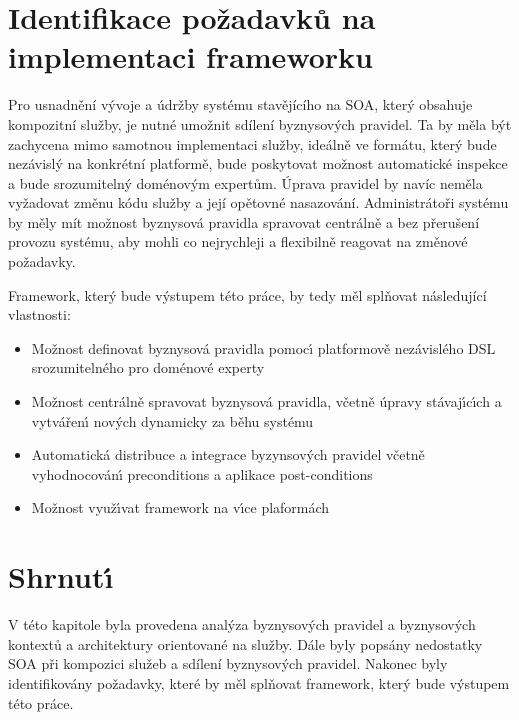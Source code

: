 \section{Identifikace požadavků na implementaci frameworku}\label{sec:implementation-requirements}

Pro usnadnění vývoje a údržby systému stavějícího na \gls{SOA}, který
obsahuje kompozitní služby, je nutné umožnit sdílení byznysových pravidel.
Ta by měla být zachycena mimo samotnou implementaci služby, ideálně ve formátu, který bude nezávislý na
konkrétní platformě, bude poskytovat možnost automatické inspekce a bude srozumitelný doménovým expertům.
Úprava pravidel by navíc neměla vyžadovat změnu kódu služby a její opětovné nasazování.
Administrátoři systému by měly mít možnost byznysová pravidla spravovat centrálně a bez
přerušení provozu systému, aby mohli co nejrychleji a flexibilně reagovat na změnové požadavky.

Framework, který bude výstupem této práce, by tedy měl splňovat následující vlastnosti:

\begin{itemize}
    \item{Možnost definovat byznysová pravidla pomoc\'{\i} platformově nezávislého \gls{DSL} srozumitelného pro doménové experty}
    \item{Možnost centrálně spravovat byznysová pravidla, včetně úpravy stávaj\'{\i}c\'{\i}ch a vytvářen\'{\i} nov\'ych dynamicky za běhu systému}
    \item{Automatická distribuce a integrace byzynsových pravidel včetně vyhodnocován\'{\i} preconditions a aplikace post-conditions}
    \item{Možnost využ\'{\i}vat framework na v\'{\i}ce plaformách}
\end{itemize}

\section{Shrnut\'{\i}}

V této kapitole byla provedena analýza byznysov\'ych pravidel a byznysov\'ych kontextů a architektury orientované na služby.
Dále byly popsány nedostatky \gls{SOA} při kompozici služeb a sdílení byznysových pravidel.
Nakonec byly identifikovány požadavky, které by měl splňovat framework, který bude v\'ystupem této práce.
